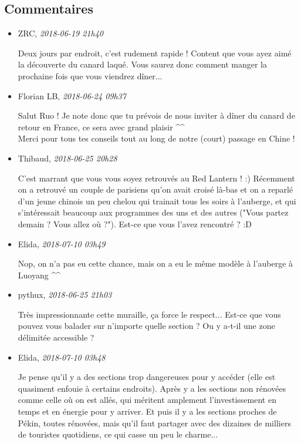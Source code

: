 \hypertarget{commentaires}{%
\subsection{Commentaires}\label{commentaires}}

\begin{itemize}
\item
  ZRC, \emph{2018-06-19 21h40}

  Deux jours par endroit, c'est rudement rapide ! Content que vous ayez
  aimé la découverte du canard laqué. Vous saurez donc comment manger la
  prochaine fois que vous viendrez dîner...
\item
  Florian LB, \emph{2018-06-24 09h37}

  Salut Ruo ! Je note donc que tu prévois de nous inviter à dîner du
  canard de retour en France, ce sera avec grand plaisir \^{}\^{}\\
  Merci pour tous tes conseils tout au long de notre (court) passage en
  Chine !
\item
  Thibaud, \emph{2018-06-25 20h28}

  C'est marrant que vous vous soyez retrouvés au Red Lantern ! :)
  Récemment on a retrouvé un couple de parisiens qu'on avait croisé
  là-bas et on a reparlé d'un jeune chinois un peu chelou qui trainait
  tous les soirs à l'auberge, et qui s'intéressait beaucoup aux
  programmes des uns et des autres ("Vous partez demain ? Vous allez où
  ?"). Est-ce que vous l'avez rencontré ? :D
\item
  Elida, \emph{2018-07-10 03h49}

  Nop, on n'a pas eu cette chance, mais on a eu le même modèle à
  l'auberge à Luoyang \^{}\^{}
\item
  pythux, \emph{2018-06-25 21h03}

  Très impressionnante cette muraille, ça force le respect... Est-ce que
  vous pouvez vous balader sur n'importe quelle section ? Ou y a-t-il
  une zone délimitée accessible ?
\item
  Elida, \emph{2018-07-10 03h48}

  Je pense qu'il y a des sections trop dangereuses pour y accéder (elle
  est quasiment enfouie à certains endroits). Après y a les sections non
  rénovées comme celle où on est allés, qui méritent amplement
  l'investissement en temps et en énergie pour y arriver. Et puis il y a
  les sections proches de Pékin, toutes rénovées, mais qu'il faut
  partager avec des dizaines de milliers de touristes quotidiens, ce qui
  casse un peu le charme...
\end{itemize}

